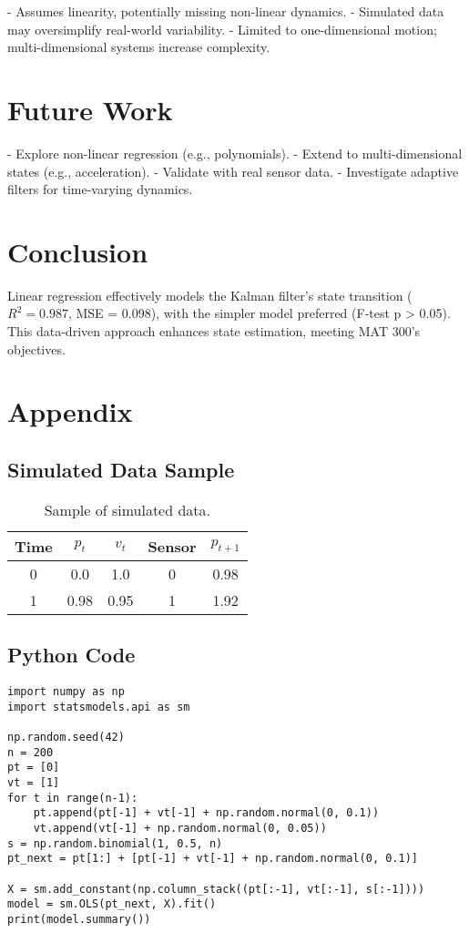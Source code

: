 \documentclass[12pt]{article}
\begin{document}
- Assumes linearity, potentially missing non-linear dynamics.
- Simulated data may oversimplify real-world variability.
- Limited to one-dimensional motion; multi-dimensional systems increase complexity.

\section{Future Work}
\label{sec:future_work}

- Explore non-linear regression (e.g., polynomials).
- Extend to multi-dimensional states (e.g., acceleration).
- Validate with real sensor data.
- Investigate adaptive filters for time-varying dynamics.

\section{Conclusion}
\label{sec:conclusion}

Linear regression effectively models the Kalman filter’s state transition (\( R^2 = 0.987 \), MSE = 0.098), with the simpler model preferred (F-test p > 0.05). This data-driven approach enhances state estimation, meeting MAT 300’s objectives.

\section{Appendix}
\label{sec:appendix}

\subsection{Simulated Data Sample}
\label{subsec:sim_data_sample}

\begin{table}[h]
    \centering
    \begin{tabular}{|c|c|c|c|c|}
        \hline
        Time & \( p_t \) & \( v_t \) & Sensor & \( p_{t+1} \) \\
        \hline
        0 & 0.0 & 1.0 & 0 & 0.98 \\
        1 & 0.98 & 0.95 & 1 & 1.92 \\
        \hline
    \end{tabular}
    \caption{Sample of simulated data.}
    \label{tab:data_sample}
\end{table}

\subsection{Python Code}
\label{subsec:python_code}

\begin{lstlisting}
import numpy as np
import statsmodels.api as sm

np.random.seed(42)
n = 200
pt = [0]
vt = [1]
for t in range(n-1):
    pt.append(pt[-1] + vt[-1] + np.random.normal(0, 0.1))
    vt.append(vt[-1] + np.random.normal(0, 0.05))
s = np.random.binomial(1, 0.5, n)
pt_next = pt[1:] + [pt[-1] + vt[-1] + np.random.normal(0, 0.1)]

X = sm.add_constant(np.column_stack((pt[:-1], vt[:-1], s[:-1])))
model = sm.OLS(pt_next, X).fit()
print(model.summary())
\end{lstlisting}
\end{document}
